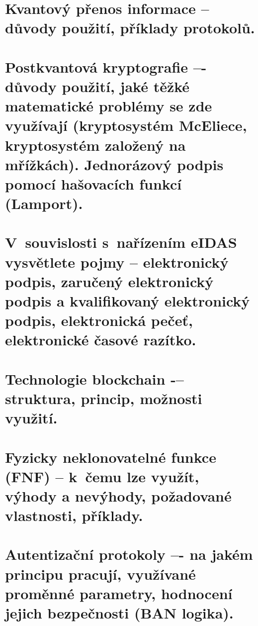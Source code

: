 \clearpage
\section{Kvantový přenos informace -- důvody použití, příklady protokolů.}

\clearpage
\section{Postkvantová kryptografie –- důvody použití, jaké těžké matematické problémy se zde využívají (kryptosystém McEliece, kryptosystém založený na mřížkách). Jednorázový podpis pomocí hašovacích funkcí (Lamport).}

\clearpage
\section{V~souvislosti s~nařízením eIDAS vysvětlete pojmy -- elektronický podpis, zaručený elektronický podpis a kvalifikovaný elektronický podpis, elektronická pečeť, elektronické časové razítko.}

\clearpage
\section{Technologie blockchain -– struktura, princip, možnosti využití.}

\clearpage
\section{Fyzicky neklonovatelné funkce (FNF) -- k~čemu lze využít, výhody a nevýhody, požadované vlastnosti, příklady.}

\clearpage
\section{Autentizační protokoly –- na jakém principu pracují, využívané proměnné parametry, hodnocení jejich bezpečnosti (BAN logika).}
